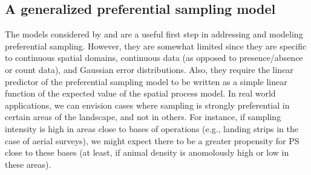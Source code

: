 \documentclass[times,mee,doublespace,]{besauth2}
\begin{document}
\subsection{A generalized preferential sampling model}

The models considered by \citet{DiggleEtAl2010} and \citet{PatiEtAl2011} are a useful first step in addressing and modeling preferential sampling.  However, they are somewhat limited since they are specific to continuous spatial domains, continuous data (as opposed to presence/absence or count data), and Gaussian error distributions.  Also, they require the linear predictor of the preferential sampling model to be written as a simple linear function of the expected value of the spatial process model.  In real world applications, we can envision cases where sampling is strongly preferential in certain areas of the landscape, and not in others.  For instance, if sampling intensity is high in areas close to bases of operations (e.g., landing strips in the case of aerial surveys), we might expect there to be a greater propensity for PS close to these bases (at least, if animal density is anomolously high or low in these areas).
\end{document}
